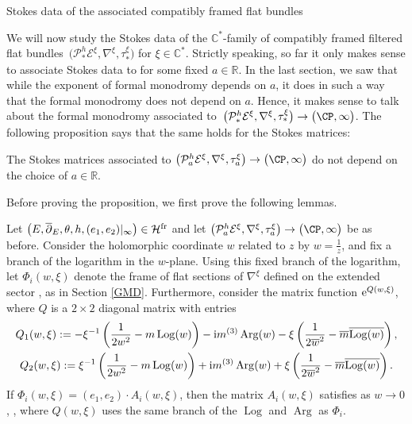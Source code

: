 \begin{subsubsection}{Stokes data of the associated compatibly framed flat bundles}

We will now study the Stokes data of the $\mathbb{C}^*$-family of compatibly framed filtered flat bundles~${\bigl(\mathcal{P}^h_*\mathcal{E}^{\xi},\nabla^{\xi}, \tau_{*}^{\xi}\bigr)}$ for $\xi \in \mathbb{C}^*$. Strictly speaking, so far it only makes sense to associate Stokes data to  for some fixed $a\in \mathbb{R}$. In the last section, we saw that while the exponent of formal monodromy depends on $a$, it does in such a way that the formal monodromy does not depend on $a$. Hence, it makes sense to talk about the formal monodromy associated to~${\bigl(\mathcal{P}^h_*\mathcal{E}^{\xi},\nabla^{\xi}, \tau_{*}^{\xi}\bigr)\to \bigl(\CP,\infty\bigr)}$. The following proposition says that the same holds for the Stokes matrices:

\begin{Proposition}\label{SM} The Stokes matrices associated to $\bigl(\mathcal{P}^h_a\mathcal{E}^{\xi},\nabla^{\xi}, \tau_{a}^{\xi}\bigr)\to \bigl(\CP,\infty\bigr)$ do not depend on the choice of $a\in \mathbb{R}$.
\end{Proposition}

Before proving the proposition, we first prove the following lemmas.
\begin{Lemma}\label{twistasymp}
 Let $\bigl(E,\overline{\partial}_E,\theta,h,(e_1,e_2)|_{\infty}\bigr)\in \mathcal{H}^{{\rm fr}}$ and let $\bigl(\mathcal{P}^h_a\mathcal{E}^{\xi},\nabla^{\xi}, \tau_{a}^{\xi}\bigr)\to \bigl(\CP,\infty\bigr)$ be as before. Consider the holomorphic coordinate $w$ related to $z$ by $w=\frac{1}{z}$, and fix a branch of the logarithm in the $w$-plane. Using this fixed branch of the logarithm, let $\Phi_i(w,\xi)$ denote the frame of flat sections of $\nabla^{\xi}$ defined on the extended sector , as in Section {\rm\ref{GMD}}. Furthermore, consider the matrix function ${\rm e}^{Q(w,\xi)}$, where $Q$ is a $2\times 2$ diagonal matrix with entries
\begin{gather*}
 Q_1(w,\xi):= -\xi^{-1}\left(\frac{1}{2w^2}-m\operatorname{Log}(w)\right)-{\rm i}m^{(3)}\operatorname{Arg}(w)-\xi\left(\frac{1}{2\overline{w}^2}-\overline{m}\overline{\operatorname{Log}(w)}\right),\\
 Q_2(w,\xi):=\xi^{-1}\left(\frac{1}{2w^2}-m\operatorname{Log}(w)\right)+{\rm i}m^{(3)}\operatorname{Arg}(w)+\xi\left(\frac{1}{2\overline{w}^2}
 -\overline{m}\overline{\operatorname{Log}(w)}\right).
\end{gather*}
 If $\Phi_i(w,\xi)=(e_1,e_2)\cdot A_i(w,\xi)$, then the matrix $A_i(w,\xi)$ satisfies
 as $ w\to 0$, ,
where $Q(w,\xi)$ uses the same branch of the $\operatorname{Log}$ and $\operatorname{Arg}$ as $\Phi_i$.
\end{Lemma}


\end{subsubsection}
